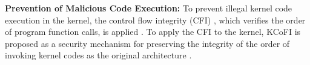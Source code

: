 {\bf Prevention of Malicious Code Execution:}
To prevent illegal kernel code execution in the kernel, the control flow
integrity (CFI) \cite{abadi05ccs}, which verifies the order of program function
calls, is applied \cite{cfi-lwn}. 
%
To apply the CFI to the kernel, KCoFI is proposed as a security mechanism for
preserving the integrity of the order of invoking  kernel codes as the original
architecture \cite{criswell14sp}.




